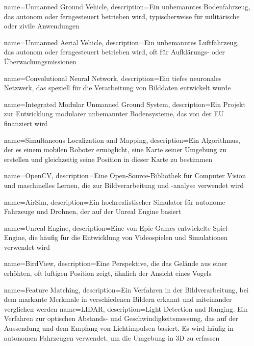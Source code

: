 {
    name=Unmanned Ground Vehicle,
    description={Ein unbemanntes Bodenfahrzeug, das autonom oder ferngesteuert betrieben wird, typischerweise für militärische oder zivile Anwendungen}
}

{
    name=Unmanned Aerial Vehicle,
    description={Ein unbemanntes Luftfahrzeug, das autonom oder ferngesteuert betrieben wird, oft für Aufklärungs- oder Überwachungsmissionen}
}

{
    name=Convolutional Neural Network,
    description={Ein tiefes neuronales Netzwerk, das speziell für die Verarbeitung von Bilddaten entwickelt wurde}
}

{
    name=Integrated Modular Unmanned Ground System,
    description={Ein Projekt zur Entwicklung modularer unbemannter Bodensysteme, das von der EU finanziert wird}
}

{
    name=Simultaneous Localization and Mapping,
    description={Ein Algorithmus, der es einem mobilen Roboter ermöglicht, eine Karte seiner Umgebung zu erstellen und gleichzeitig seine Position in dieser Karte zu bestimmen}
}

{
    name=OpenCV,
    description={Eine Open-Source-Bibliothek für Computer Vision und maschinelles Lernen, die zur Bildverarbeitung und -analyse verwendet wird}
}

{
    name=AirSim,
    description={Ein hochrealistischer Simulator für autonome Fahrzeuge und Drohnen, der auf der Unreal Engine basiert}
}

{
    name=Unreal Engine,
    description={Eine von Epic Games entwickelte Spiel-Engine, die häufig für die Entwicklung von Videospielen und Simulationen verwendet wird}
}

{
    name=BirdView,
    description={Eine Perspektive, die das Gelände aus einer erhöhten, oft luftigen Position zeigt, ähnlich der Ansicht eines Vogels}
}

{
    name=Feature Matching,
    description={Ein Verfahren in der Bildverarbeitung, bei dem markante Merkmale in verschiedenen Bildern erkannt und miteinander verglichen werden}
}
{
    name=LIDAR,
    description={Light Detection and Ranging. Ein Verfahren zur optischen Abstands- und Geschwindigkeitsmessung, das auf der Aussendung und dem Empfang von Lichtimpulsen basiert. Es wird häufig in autonomen Fahrzeugen verwendet, um die Umgebung in 3D zu erfassen}
}
